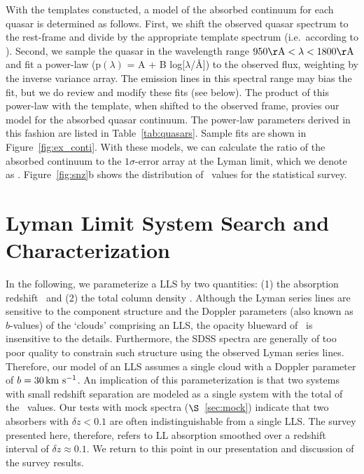 \documentclass[12pt,preprint]{aastex}
\begin{document}
With the templates constucted, a model of the absorbed continuum
for each quasar is determined as follows.
First, we shift the observed quasar spectrum to the rest-frame
and divide by the appropriate template spectrum (i.e.\ according to \zem).
Second, we sample the quasar in the wavelength range 
$950 \rm \AA < \lambda < 1800 \rm \AA$ and fit a power-law 
(p$(\lambda)$ = A + B log[$\lambda$/\AA]) to the observed 
flux, weighting by the inverse variance array.
The emission lines in this spectral range may bias the fit,
but we do review and modify these fits (see below).
The product of this power-law with the template, when
shifted to the observed frame, provies our model for the
absorbed quasar continuum.  The power-law parameters derived
in this fashion are listed in Table~\ref{tab:quasars}.
Sample fits are shown in Figure~\ref{fig:ex_conti}.
With these models, we can calculate the ratio of the absorbed
continuum to the $1\sigma$-error array at the Lyman limit,
which we denote as \sna.
Figure~\ref{fig:snz}b shows the distribution of \sna\ values
for the statistical survey.

\section{Lyman Limit System Search and Characterization}
\label{sec:lls}

In the following, we parameterize a LLS by two quantities:
(1) the absorption redshift \zlls\ and
(2) the total  column density \nhi.
Although the  Lyman series lines are sensitive to the component
structure and the Doppler parameters (also known as $b$-values)
of the `clouds' comprising an LLS,
the opacity blueward of \lll\ is insensitive to the details.
Furthermore, the SDSS spectra are generally of too poor quality
to constrain such structure using the observed Lyman series lines.
Therefore, our model of an LLS assumes a single cloud with a 
Doppler parameter of $b=30 \,{\rm km~s^{-1}}$.
An implication of this parameterization is that two systems with
small redshift separation are modeled as a single system with
the total of the \nhi\ values.  Our tests with mock spectra ($\S$~\ref{sec:mock})
indicate that two absorbers with $\delta z < 0.1$ are often
indistinguishable from a single LLS.  The survey presented here,
therefore, refers to LL absorption smoothed over a redshift
interval of $\delta z \approx 0.1$.  We return to this point
in our presentation and discussion of the survey results.
\end{document}
